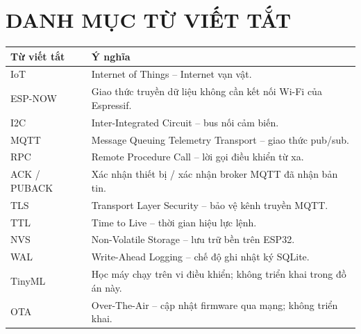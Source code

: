\documentclass[12pt,a4paper,oneside]{report}
\begin{document}
\chapter*{DANH MỤC TỪ VIẾT TẮT}
\begin{longtable}{P{3cm}P{12cm}}
\toprule Từ viết tắt & Ý nghĩa \\ \midrule
IoT & Internet of Things -- Internet vạn vật. \\
ESP-NOW & Giao thức truyền dữ liệu không cần kết nối Wi-Fi của Espressif. \\
I2C & Inter-Integrated Circuit -- bus nối cảm biến. \\
MQTT & Message Queuing Telemetry Transport -- giao thức pub/sub. \\
RPC & Remote Procedure Call -- lời gọi điều khiển từ xa. \\
ACK / PUBACK & Xác nhận thiết bị / xác nhận broker MQTT đã nhận bản tin. \\
TLS & Transport Layer Security -- bảo vệ kênh truyền MQTT. \\
TTL & Time to Live -- thời gian hiệu lực lệnh. \\
NVS & Non-Volatile Storage -- lưu trữ bền trên ESP32. \\
WAL & Write-Ahead Logging -- chế độ ghi nhật ký SQLite. \\
TinyML & Học máy chạy trên vi điều khiển; không triển khai trong đồ án này. \\
OTA & Over-The-Air -- cập nhật firmware qua mạng; không triển khai. \\
\bottomrule
\end{longtable}
\clearpage{}








\end{document}
